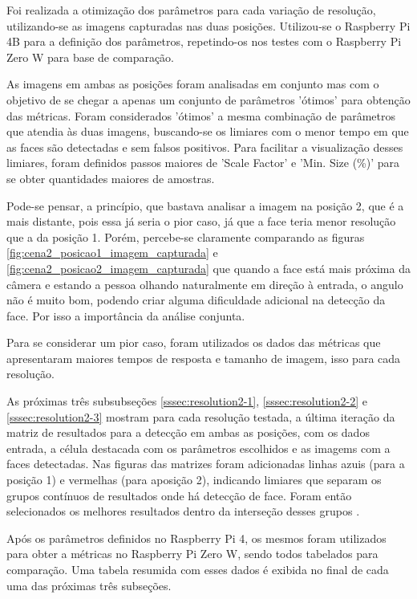 Foi realizada a otimização dos parâmetros para cada variação de resolução, utilizando-se as imagens capturadas nas duas posições. Utilizou-se o Raspberry Pi 4B para a definição dos parâmetros, repetindo-os nos testes com o Raspberry Pi Zero W para base de comparação.

As imagens em ambas as posições foram analisadas em conjunto mas com o objetivo de se chegar a apenas um conjunto de parâmetros 'ótimos' para obtenção das métricas. Foram considerados 'ótimos' a mesma combinação de parâmetros que atendia às duas imagens, buscando-se os limiares com o menor tempo em que as faces são detectadas e sem falsos positivos. Para facilitar a visualização desses limiares, foram definidos passos maiores de 'Scale Factor' e 'Min. Size (\%)' para se obter quantidades maiores de amostras.

Pode-se pensar, a princípio, que bastava analisar a imagem na posição 2, que é a mais distante, pois essa já seria o pior caso, já que a face teria menor resolução que a da posição 1. Porém, percebe-se claramente comparando as figuras \ref{fig:cena2_posicao1_imagem_capturada} e \ref{fig:cena2_posicao2_imagem_capturada} que quando a face está mais próxima da câmera e estando a pessoa olhando naturalmente em direção à entrada, o angulo não é muito bom, podendo criar alguma dificuldade adicional na detecção da face. Por isso a importância da análise conjunta.

Para se considerar um pior caso, foram utilizados os dados das métricas que apresentaram maiores tempos de resposta e tamanho de imagem, isso para cada resolução.

As próximas três subsubseções \ref{sssec:resolution2-1}, \ref{sssec:resolution2-2} e \ref{sssec:resolution2-3} mostram para cada resolução testada, a última iteração da matriz de resultados para a detecção em ambas as posições, com os dados entrada, a célula destacada com os parâmetros escolhidos e as imagems com a faces detectadas. Nas figuras das matrizes foram adicionadas linhas azuis (para a posição 1) e vermelhas (para aposição 2), indicando limiares que separam os grupos contínuos de resultados onde há detecção de face. Foram então selecionados os melhores resultados dentro da interseção desses grupos .

Após os parâmetros definidos no Raspberry Pi 4, os mesmos foram utilizados para obter a métricas no Raspberry Pi Zero W, sendo todos tabelados para comparação. Uma tabela resumida com esses dados é exibida no final de cada uma das próximas três subseções.

